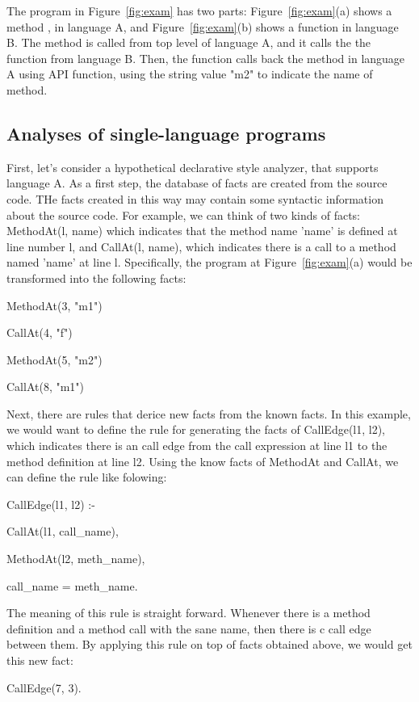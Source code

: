 The program in Figure~\ref{fig:exam} has two parts: Figure~\ref{fig:exam}(a)
shows a method ,  in language A, and
Figure~\ref{fig:exam}(b) shows a function  in language B.  The method
 is called from top level of language A, and it calls the the
function  from language B.  Then, the function  calls back
the method  in language A using API function, using the string
value "m2" to indicate the name of method.

\subsection{Analyses of single-language programs}
First, let's consider a hypothetical declarative style analyzer, that supports
language A.  As a first step, the database of facts are created from the source
code. THe facts created in this way may contain some syntactic information
about the source code. For example, we can think of two kinds of facts:
MethodAt(l, name) which indicates that the method name 'name' is defined at
line number l, and CallAt(l, name), which indicates there is a call to a method
named 'name' at line l.  Specifically, the program at Figure~\ref{fig:exam}(a)
would be transformed into the following facts:

MethodAt(3, "m1")

CallAt(4, "f")

MethodAt(5, "m2")

CallAt(8, "m1")

Next, there are rules that derice new facts from the known facts.  In this
example, we would want to define the rule for generating the facts of
CallEdge(l1, l2), which indicates there is an call edge from the call
expression at line l1 to the method definition at line l2. Using the know facts
of MethodAt and CallAt, we can define the rule like folowing:

CallEdge(l1, l2) :-

    CallAt(l1, call\_name),
    
    MethodAt(l2, meth\_name),
    
    call\_name = meth\_name.

The meaning of this rule is straight forward. Whenever there is a method
definition and a method call with the sane name, then there is c call edge
between them.  By applying this rule on top of facts obtained above, we would
get this new fact:

CallEdge(7, 3).

